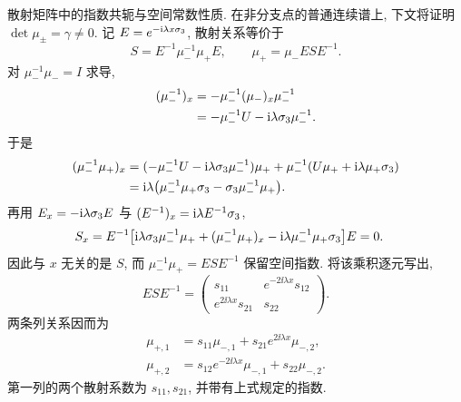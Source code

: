 \par\smallskip\noindent 散射矩阵中的指数共轭与空间常数性质.\quad
在非分支点的普通连续谱上, 下文将证明 $\det\mu_\pm=\gamma\ne0$.
记 $E=e^{-\mathrm{i}\lambda x\sigma_3}$, 散射关系等价于
\begin{equation*}
S=E^{-1}\mu_-^{-1}\mu_+E,
\qquad \mu_+=\mu_-ESE^{-1}.
\end{equation*}
对 $\mu_-^{-1}\mu_-=I$ 求导,
\begin{align*}
(\mu_-^{-1})_x
&=-\mu_-^{-1}(\mu_-)_x\mu_-^{-1}\\
&=-\mu_-^{-1}U-\mathrm{i}\lambda\sigma_3\mu_-^{-1}.
\end{align*}
于是
\begin{align*}
(\mu_-^{-1}\mu_+)_x
&=(-\mu_-^{-1}U-\mathrm{i}\lambda\sigma_3\mu_-^{-1})\mu_+
+\mu_-^{-1}(U\mu_++\mathrm{i}\lambda\mu_+\sigma_3)\\
&=\mathrm{i}\lambda\bigl(\mu_-^{-1}\mu_+\sigma_3
-\sigma_3\mu_-^{-1}\mu_+\bigr).
\end{align*}
再用 $E_x=-\mathrm{i}\lambda\sigma_3 E$ 与 $(E^{-1})_x=\mathrm{i}\lambda E^{-1}\sigma_3$,
\begin{align*}
S_x
&=E^{-1}\bigl[\mathrm{i}\lambda\sigma_3\mu_-^{-1}\mu_+
+(\mu_-^{-1}\mu_+)_x
-\mathrm{i}\lambda\mu_-^{-1}\mu_+\sigma_3\bigr]E=0.
\end{align*}
因此与 $x$ 无关的是 $S$, 而 $\mu_-^{-1}\mu_+=ESE^{-1}$ 保留空间指数.
将该乘积逐元写出,
\begin{equation*}
ESE^{-1}
=\begin{pmatrix}
s_{11}&e^{-2\ii\lambda x}s_{12}\\
e^{2\ii\lambda x}s_{21}&s_{22}
\end{pmatrix}.
\end{equation*}
两条列关系因而为
\begin{align*}
\mu_{+,1}&=s_{11}\mu_{-,1}
+s_{21}e^{2\ii\lambda x}\mu_{-,2},\\
\mu_{+,2}&=s_{12}e^{-2\ii\lambda x}\mu_{-,1}
+s_{22}\mu_{-,2}.
\end{align*}
第一列的两个散射系数为 $s_{11},s_{21}$, 并带有上式规定的指数.

